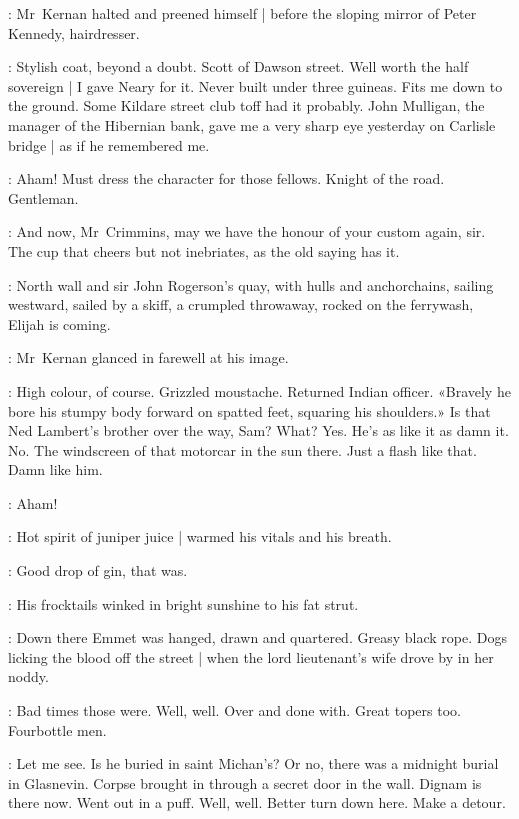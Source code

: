 :
Mr~Kernan halted and preened himself |
before the sloping mirror of Peter Kennedy, hairdresser.

:
Stylish coat, beyond a doubt.
Scott of Dawson street.
Well worth the half sovereign |
I gave Neary for it.
Never built under three guineas.
Fits me down to the ground.
Some Kildare street club toff had it probably.
John Mulligan, the manager of the Hibernian bank,
gave me a very sharp eye yesterday
on Carlisle bridge |
as if he remembered me.

:
Aham!
Must dress the character for those fellows.
Knight of the road.
Gentleman.

:
And now, Mr~Crimmins,
may we have the honour of your custom again, sir.%
The cup that cheers but not inebriates,
as the old saying has it.

\begin{interject}
    :
    North wall and sir John Rogerson's quay,
    with hulls and anchorchains,
    sailing westward,
    sailed by a skiff,
    a crumpled throwaway,
    rocked on the ferrywash,
    Elijah is coming.
\end{interject}

:
Mr~Kernan glanced in farewell at his image.

:
High colour, of course.
Grizzled moustache.
Returned Indian officer.
«Bravely he bore his stumpy body forward on spatted feet,
squaring his shoulders.»
Is that Ned Lambert's brother over the way, Sam?
What?
Yes.
He's as like it as damn it.
No.
The windscreen of that motorcar in the sun there.
Just a flash like that.
Damn like him.%

:
Aham!

:
Hot spirit of juniper juice |
warmed his vitals and his breath.

:
Good drop of gin, that was.

:
His frocktails winked in bright sunshine to his fat strut.

:
Down there Emmet was hanged, drawn and quartered.
Greasy black rope.
Dogs licking the blood off the street |
when the lord lieutenant's wife drove by in her noddy.

:
Bad times those were.
Well, well.
Over and done with.
Great topers too.
Fourbottle men.

:
Let me see.
Is he buried in saint Michan's?
Or no, there was a midnight burial in Glasnevin.%
Corpse brought in through a secret door in the wall.
Dignam is there now.
Went out in a puff.
Well, well.
Better turn down here.
Make a detour.

